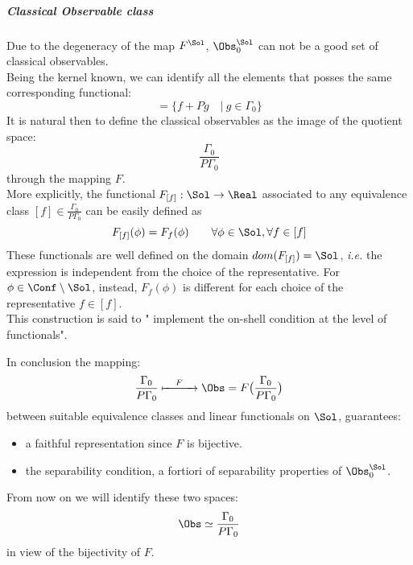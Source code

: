 \documentclass[Main]{subfiles}
\begin{document}
   			\subparagraph{Classical Observable class}
   					Due to the degeneracy of the map $F^\Sol$, %
   					$\Obs_0^\Sol$ can not be a good set of classical observables.\\
   					Being the kernel known, we can identify all the elements that posses the same corresponding functional:
   					\begin{displaymath}
   						[f] = \big\{f + P g \quad\vert\: g \in \Gamma_0\big\}
   					\end{displaymath}
   					It is natural then to define the classical observables as the image of the quotient space:
   									\begin{displaymath}
   										\frac{\Gamma_0}{P\Gamma_0}
   									\end{displaymath}
   					through the mapping $F$.
   					\\
   					\vspace{2mm}
   					More explicitly, the functional  $F_{[f]} : \Sol \rightarrow  \Real$ associated to any equivalence class $[f] \in \frac{\Gamma_0}{P\Gamma_0}$  can be easily defined as
   					\begin{displaymath}
   						F_{[f]} (\phi) = F_f(\phi) \qquad \forall \phi \in \Sol , \forall f \in [f]
   					\end{displaymath}
   					These functionals are well defined on the domain $dom(F_{[f]}) = \Sol$, \textit{i.e.} the expression is independent from the choice of the representative.
   					For $\phi \in \Conf \setminus \Sol$, instead, $F_f(\phi)$ is different for each choice of the representative $f \in [f]$.
   					\\
   					This construction is said to " implement the  on-shell condition at the level of functionals".

   					In conclusion the mapping:
   					\begin{displaymath}
   						\frac{\Gamma_0}{P \Gamma_0}  \xmapsto{\quad F \quad} \Obs = F \big( \frac{\Gamma_0}{P \Gamma_0}\big)
   					\end{displaymath}
   					between suitable equivalence classes  and linear functionals on $\Sol$, guarantees:
   					\begin{itemize}
   						\item a faithful representation since $F$ is bijective.
   						\item the separability condition, a fortiori of separability properties of $\Obs_0^\Sol$.
   					\end{itemize}
   					From now on we will identify these two spaces:
   					\begin{displaymath}
   						\Obs \simeq 	\frac{\Gamma_0}{P \Gamma_0}
   					\end{displaymath}
   					in view of the bijectivity of $F$.
\end{document}
